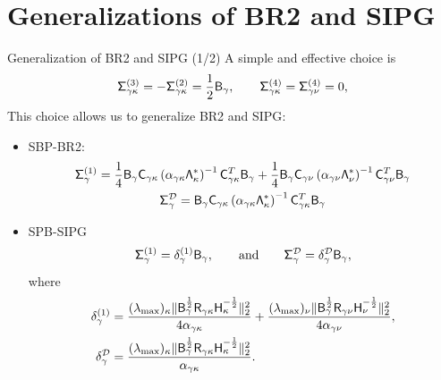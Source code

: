 \documentclass{beamer}
\begin{document}
\section{Generalizations of BR2 and SIPG}
\begin{frame}{Generalization of BR2 and SIPG (1/2)}
    A simple and effective choice is
    \footnotesize
    \begin{equation*}
    \mathsf{\Sigma}_{\gamma\kappa}^{(3)} = -\mathsf{\Sigma}_{\gamma\kappa}^{(2)} = \frac{1}{2}\mathsf{B}_{\gamma}, \qquad
    \mathsf{\Sigma}_{\gamma\kappa}^{(4)} = \mathsf{\Sigma}_{\gamma\nu} ^{(4)} = 0,
    \end{equation*}
    \normalsize
    This choice allows us to generalize BR2\cite{Bassi2005} and SIPG\cite{hartmann:2007b}:
    \begin{itemize}
        \item SBP-BR2:
        \footnotesize
        \begin{gather*}
        \mathsf{\Sigma}_{\gamma}^{(1)} = \frac{1}{4}\mathsf{B}_{\gamma} \mathsf{C}_{\gamma\kappa}
        \left(\alpha_{\gamma\kappa}\mathsf{\Lambda}_{\kappa}^{*}\right)^{-1}\mathsf{C}_{\gamma\kappa}^T \mathsf{B}_{\gamma}
        + \frac{1}{4}\mathsf{B}_{\gamma} \mathsf{C}_{\gamma\nu} \left(\alpha_{\gamma\nu} \mathsf{\Lambda}_{\nu}^{*}\right)^{-1}\mathsf{C}_{\gamma\nu}^T \mathsf{B}_{\gamma} \\
        \mathsf{\Sigma}_{\gamma}^{\mathcal{D}} = \mathsf{B}_{\gamma} \mathsf{C}_{\gamma\kappa}
        \left(\alpha_{\gamma\kappa}\mathsf{\Lambda}_{\kappa}^{*}\right)^{-1}\mathsf{C}_{\gamma\kappa}^T \mathsf{B}_{\gamma} \\
        \end{gather*}
        \normalsize
        \item SPB-SIPG
        \footnotesize
        \begin{equation*} 
        \mathsf{\Sigma}_{\gamma}^{(1)} = \delta_{\gamma}^{(1)} \mathsf{B}_{\gamma},
        \qquad\text{and}\qquad
        \mathsf{\Sigma}_{\gamma}^{\mathcal{D}} = \delta_{\gamma}^{\mathcal{D}} \mathsf{B}_{\gamma},
        \end{equation*}
        \normalsize
        where 
        \footnotesize
        \begin{align*}
        \delta_{\gamma}^{(1)} &= \frac{(\lambda_{\max})_\kappa 
            \| \Bg^{\frac{1}{2}} \Rgk \Hk^{-\frac{1}{2}} \|_{2}^{2}}%
        {4 \alpha_{\gamma\kappa}} 
        + \frac{(\lambda_{\max})_\nu 
            \| \Bg^{\frac{1}{2}} \Rgn \H_{\nu}^{-\frac{1}{2}} \|_{2}^{2}}%
        {4 \alpha_{\gamma\nu}}, \\ 
        \delta_{\gamma}^\fnc{D} &= \frac{(\lambda_{\max})_\kappa 
            \| \Bg^{\frac{1}{2}} \Rgk \Hk^{-\frac{1}{2}} \|_{2}^{2}}%
        {\alpha_{\gamma\kappa}} .
        \end{align*}
    \end{itemize}
\end{frame}
\end{document}
